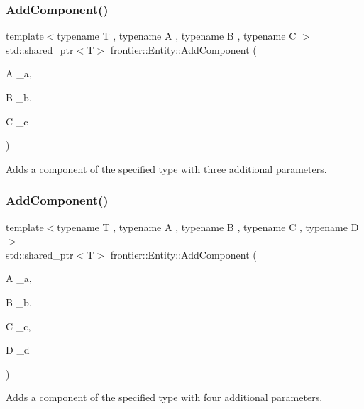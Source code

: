 \subsubsection{\texorpdfstring{Add\+Component()}{AddComponent()}\hspace{0.1cm}{\footnotesize\ttfamily [4/5]}}
{\footnotesize\ttfamily template$<$typename T , typename A , typename B , typename C $>$ \\
std\+::shared\+\_\+ptr$<$T$>$ frontier\+::\+Entity\+::\+Add\+Component (\begin{DoxyParamCaption}\item[{A}]{\+\_\+a,  }\item[{B}]{\+\_\+b,  }\item[{C}]{\+\_\+c }\end{DoxyParamCaption})\hspace{0.3cm}{\ttfamily [inline]}}



Adds a component of the specified type with three additional parameters. 

\mbox{\label{classfrontier_1_1_entity_a892c1807ca5a19e92b9e4f4d04b26131}} 
\subsubsection{\texorpdfstring{Add\+Component()}{AddComponent()}\hspace{0.1cm}{\footnotesize\ttfamily [5/5]}}
{\footnotesize\ttfamily template$<$typename T , typename A , typename B , typename C , typename D $>$ \\
std\+::shared\+\_\+ptr$<$T$>$ frontier\+::\+Entity\+::\+Add\+Component (\begin{DoxyParamCaption}\item[{A}]{\+\_\+a,  }\item[{B}]{\+\_\+b,  }\item[{C}]{\+\_\+c,  }\item[{D}]{\+\_\+d }\end{DoxyParamCaption})\hspace{0.3cm}{\ttfamily [inline]}}



Adds a component of the specified type with four additional parameters. 

\mbox{\label{classfrontier_1_1_entity_a7e8950fc46a87fca465a94f66ac40494}} 
